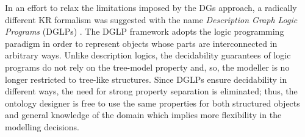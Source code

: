 \documentclass[10pt]{bmc_article}
\newenvironment{bmcformat}{\baselineskip20pt\sloppy\setboolean{publ}{false}}{\baselineskip20pt\sloppy}
\begin{document}
\begin{bmcformat}
\begin{comment}
\draw [->,densely dashed] (cb) -- (c1);
 \draw [->,densely dashed] (cb) -- (c2);
 \draw [->,densely dashed] (cb) to [bend left=60]  (c3);
\draw [->,densely dashed] (cb) to [bend right=30] (c4);
\draw [->,densely dashed] (cb) to [bend right=60] (c5);
\draw [->,densely dashed] (cb) to (c6);
\node (caption) at (-1,-2.75) [] {(b) Canonical model with the DGs definition};
\end{tikzpicture}
&
\begin{tikzpicture}[thick]
\node (e1) at (-2.5,2.25) [] {};
\node (e2) at (-0.5,2.25) [] {};
\draw [->,densely dashed] (e1) -- (e2) node[midway,above]{$\mathsf{hasAtom}$};
\node (e1) at (-2.5,1.65) [] {};
\node (e2) at (-0.5,1.65) [] {};
\draw [-] (e1) -- (e2) node[midway,above]{$\mathsf{hasSingleBondWith}$};
\node (e1) at (-2.5,1.15) [] {};
\node (e2) at (-0.5,1.15) [] {};
\draw [-,double] (e1) -- (e2) node[midway,above]{$\mathsf{hasDoubleBondWith}$};

\node (c1) at (0.84,1.48) [] {\textbf{C}};
\node (c2) at (1.68,1) [] {\textbf{C}};
\node (c3) at (1.68,0) [] {\textbf{C}};
\node (c4) at (0.84,-0.48) [] {\textbf{C}};
\node (c5) at (0,0) [] {\textbf{C}};
\node (c6) at (0,1) [] {\textbf{C}};

\draw [-,double] (c1) -- (c2);
\draw [-] (c2) -- (c3);
\draw [-,double] (c3) -- (c4);
\draw [-] (c4) -- (c5);
\draw [-,double] (c5) -- (c6);
\draw [-] (c6) -- (c1);


\node (caption) at (0,-1.75) [] {(c) Chemical graph of benzene ring};
\end{tikzpicture} 
\end{tabular}
\end{tabular}
\caption{The chemical structure and the models of benzene ring}\label{fig:benzene}
\end{figure}

\end{comment}



In an effort to relax the limitations imposed by the DGs approach, a radically different KR formalism was suggested with the name \emph{Description Graph Logic Programs} (DGLPs) \cite{magka2011}. The DGLP framework adopts the logic programming paradigm in order to represent objects whose parts are interconnected in arbitrary ways. Unlike description logics, the decidability guarantees of logic programs do not rely on the tree-model property and, so, the modeller is no longer restricted to tree-like structures. Since DGLPs ensure decidability in different ways, the need for strong property separation is eliminated; thus, the ontology designer is free to use the same properties for both structured objects and general knowledge of the domain which implies more flexibility in the  modelling decisions.  



\end{bmcformat}
\end{document}
